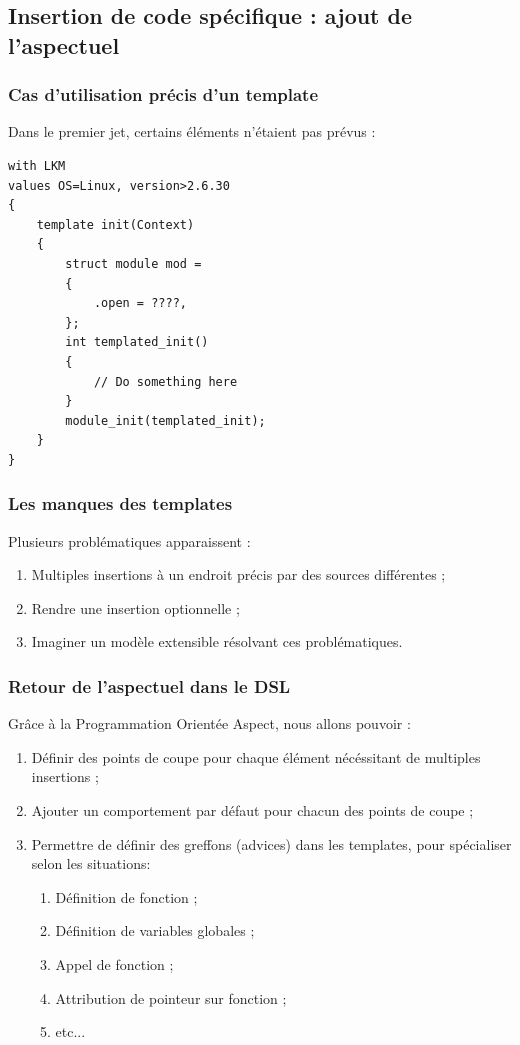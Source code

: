 \documentclass[]{beamer}
\begin{document}
\subsection{Insertion de code spécifique : ajout de l'aspectuel}
%
%
\begin{frame}[containsverbatim]
\frametitle{Cas d'utilisation précis d'un template}
Dans le premier jet, certains éléments n'étaient pas prévus :
\begin{lstlisting}
with LKM
values OS=Linux, version>2.6.30
{
    template init(Context)
    {
        struct module mod =
        {
            .open = ????,
        };
        int templated_init()
        {
            // Do something here
        }
        module_init(templated_init);
    }
}
\end{lstlisting}
\end{frame}

\begin{frame}
\frametitle{Les manques des templates}
Plusieurs problématiques apparaissent :
\begin{enumerate}
    \item Multiples insertions à un endroit précis par des sources
        différentes ;
    \item Rendre une insertion optionnelle ;
    \item Imaginer un modèle extensible résolvant ces problématiques.
\end{enumerate}
\end{frame}

\begin{frame}
\frametitle{Retour de l'aspectuel dans le DSL}
Grâce à la Programmation Orientée Aspect, nous allons pouvoir :
\begin{enumerate}[<+->]
    \item Définir des points de coupe pour chaque élément nécéssitant de
        multiples insertions ;
    \item Ajouter un comportement par défaut pour chacun des points de coupe ;
    \item Permettre de définir des greffons (advices) dans les templates,
        pour spécialiser selon les situations:
        \begin{enumerate}
            \item Définition de fonction ;
            \item Définition de variables globales ;
            \item Appel de fonction ;
            \item Attribution de pointeur sur fonction ;
            \item etc...
        \end{enumerate}
\end{enumerate}
\end{frame}
\end{document}
